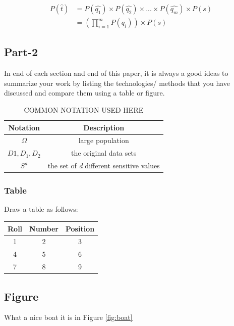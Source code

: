 \documentclass[conference]{IEEEtran}
\begin{document}
\begin{align}
	P(\hat{t}) &= P(\hat{q_1})\times P(\hat{q_{2}})\times ...\times P(\hat{q_{m}})\times P(s) \nonumber \\
&= (\prod_{i=1}^{m} P(\hat{q_{i}}))\times P(s)
\end{align}

\subsection{Part-2}
In end of each section and end of this paper, it is always a
good ideas to summarize your work by listing the technologies/
methods that you have discussed and compare them using
a table or figure.

\begin{table}[h]
\begin{center}
	\caption{COMMON NOTATION USED HERE}
	\label{notation}
	\begin{tabular}{ |c|c| } 
		\hline
		\textbf{Notation} & \textbf{Description}  \\ 
		\hline
		$\Omega$ & large population \\
		\hline 
		$D1, D_{1}, D_{2}$ & the original data sets\\
		\hline
		$ S^{d} $ & the set of \textit{d} different sensitive values\\
		\hline
		
	\end{tabular}
\end{center}
\end{table}

\vfill\null


\subsubsection{Table}
Draw a table as follows:
\begin{table}[h]
	\begin{center}
		\begin{tabular}{c|c|c}
			\hline
			Roll & Number & Position\\
			\hline
			1 & 2 & 3\\
			\hline
			4 & 5 & 6\\
			\hline
			7 & 8 & 9\\
			\hline
		\end{tabular}
	\end{center}
\end{table}

\subsection{Figure}
What a nice boat it is in Figure \ref{fig:boat}
\end{document}
